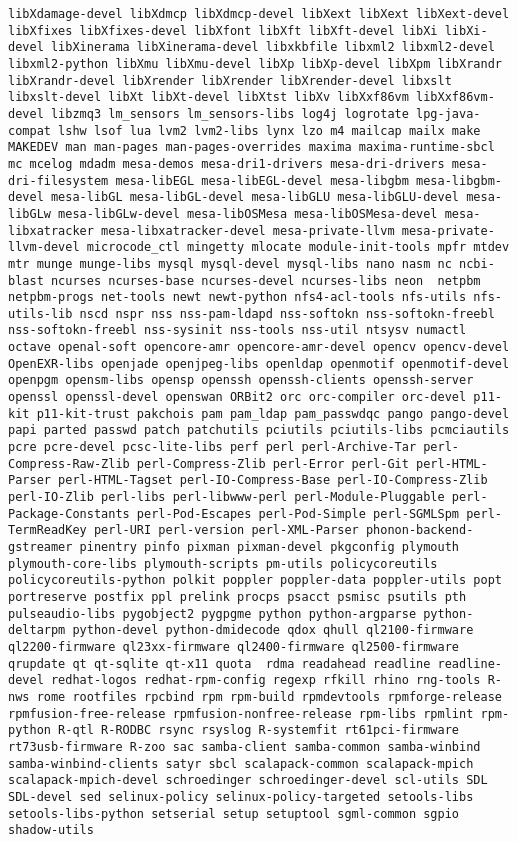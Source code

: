 \begin{lstlisting}
libXdamage-devel libXdmcp libXdmcp-devel libXext libXext libXext-devel libXfixes libXfixes-devel libXfont libXft libXft-devel libXi libXi-devel libXinerama libXinerama-devel libxkbfile libxml2 libxml2-devel libxml2-python libXmu libXmu-devel libXp libXp-devel libXpm libXrandr libXrandr-devel libXrender libXrender libXrender-devel libxslt libxslt-devel libXt libXt-devel libXtst libXv libXxf86vm libXxf86vm-devel libzmq3 lm_sensors lm_sensors-libs log4j logrotate lpg-java-compat lshw lsof lua lvm2 lvm2-libs lynx lzo m4 mailcap mailx make MAKEDEV man man-pages man-pages-overrides maxima maxima-runtime-sbcl mc mcelog mdadm mesa-demos mesa-dri1-drivers mesa-dri-drivers mesa-dri-filesystem mesa-libEGL mesa-libEGL-devel mesa-libgbm mesa-libgbm-devel mesa-libGL mesa-libGL-devel mesa-libGLU mesa-libGLU-devel mesa-libGLw mesa-libGLw-devel mesa-libOSMesa mesa-libOSMesa-devel mesa-libxatracker mesa-libxatracker-devel mesa-private-llvm mesa-private-llvm-devel microcode_ctl mingetty mlocate module-init-tools mpfr mtdev mtr munge munge-libs mysql mysql-devel mysql-libs nano nasm nc ncbi-blast ncurses ncurses-base ncurses-devel ncurses-libs neon  netpbm netpbm-progs net-tools newt newt-python nfs4-acl-tools nfs-utils nfs-utils-lib nscd nspr nss nss-pam-ldapd nss-softokn nss-softokn-freebl nss-softokn-freebl nss-sysinit nss-tools nss-util ntsysv numactl octave openal-soft opencore-amr opencore-amr-devel opencv opencv-devel OpenEXR-libs openjade openjpeg-libs openldap openmotif openmotif-devel openpgm opensm-libs opensp openssh openssh-clients openssh-server openssl openssl-devel openswan ORBit2 orc orc-compiler orc-devel p11-kit p11-kit-trust pakchois pam pam_ldap pam_passwdqc pango pango-devel papi parted passwd patch patchutils pciutils pciutils-libs pcmciautils pcre pcre-devel pcsc-lite-libs perf perl perl-Archive-Tar perl-Compress-Raw-Zlib perl-Compress-Zlib perl-Error perl-Git perl-HTML-Parser perl-HTML-Tagset perl-IO-Compress-Base perl-IO-Compress-Zlib perl-IO-Zlib perl-libs perl-libwww-perl perl-Module-Pluggable perl-Package-Constants perl-Pod-Escapes perl-Pod-Simple perl-SGMLSpm perl-TermReadKey perl-URI perl-version perl-XML-Parser phonon-backend-gstreamer pinentry pinfo pixman pixman-devel pkgconfig plymouth plymouth-core-libs plymouth-scripts pm-utils policycoreutils policycoreutils-python polkit poppler poppler-data poppler-utils popt portreserve postfix ppl prelink procps psacct psmisc psutils pth pulseaudio-libs pygobject2 pygpgme python python-argparse python-deltarpm python-devel python-dmidecode qdox qhull ql2100-firmware ql2200-firmware ql23xx-firmware ql2400-firmware ql2500-firmware qrupdate qt qt-sqlite qt-x11 quota  rdma readahead readline readline-devel redhat-logos redhat-rpm-config regexp rfkill rhino rng-tools R-nws rome rootfiles rpcbind rpm rpm-build rpmdevtools rpmforge-release rpmfusion-free-release rpmfusion-nonfree-release rpm-libs rpmlint rpm-python R-qtl R-RODBC rsync rsyslog R-systemfit rt61pci-firmware rt73usb-firmware R-zoo sac samba-client samba-common samba-winbind samba-winbind-clients satyr sbcl scalapack-common scalapack-mpich scalapack-mpich-devel schroedinger schroedinger-devel scl-utils SDL SDL-devel sed selinux-policy selinux-policy-targeted setools-libs setools-libs-python setserial setup setuptool sgml-common sgpio shadow-utils 
\end{lstlisting}
